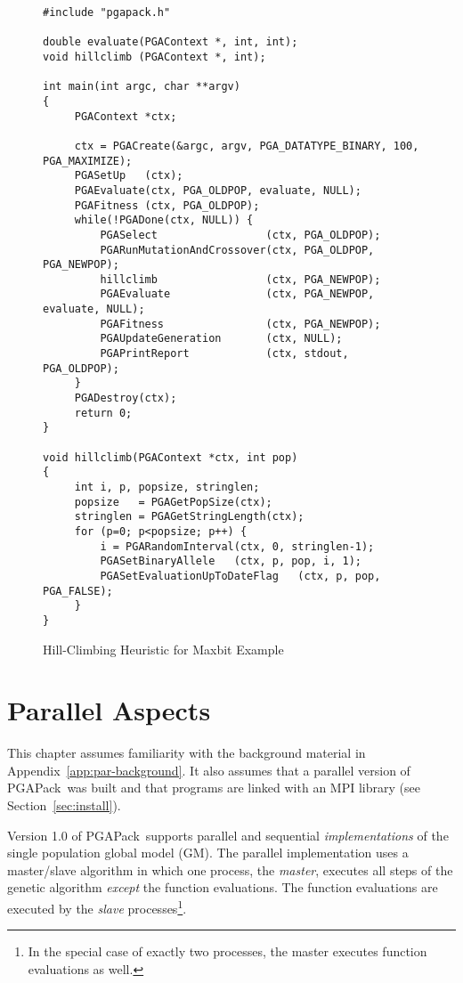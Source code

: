 \documentclass{report}
\newcommand{\pga}{PGAPack}
\begin{document}
\begin{figure}[th]
\begin{verbatim}
#include "pgapack.h"

double evaluate(PGAContext *, int, int);
void hillclimb (PGAContext *, int);

int main(int argc, char **argv)
{
     PGAContext *ctx;

     ctx = PGACreate(&argc, argv, PGA_DATATYPE_BINARY, 100, PGA_MAXIMIZE);
     PGASetUp   (ctx);
     PGAEvaluate(ctx, PGA_OLDPOP, evaluate, NULL);  
     PGAFitness (ctx, PGA_OLDPOP);
     while(!PGADone(ctx, NULL)) {
         PGASelect                 (ctx, PGA_OLDPOP);
         PGARunMutationAndCrossover(ctx, PGA_OLDPOP, PGA_NEWPOP);
         hillclimb                 (ctx, PGA_NEWPOP);
         PGAEvaluate               (ctx, PGA_NEWPOP, evaluate, NULL);
         PGAFitness                (ctx, PGA_NEWPOP);
         PGAUpdateGeneration       (ctx, NULL);
         PGAPrintReport            (ctx, stdout, PGA_OLDPOP);
     }
     PGADestroy(ctx);
     return 0;
}

void hillclimb(PGAContext *ctx, int pop)
{
     int i, p, popsize, stringlen;
     popsize   = PGAGetPopSize(ctx);
     stringlen = PGAGetStringLength(ctx);
     for (p=0; p<popsize; p++) {
         i = PGARandomInterval(ctx, 0, stringlen-1);
         PGASetBinaryAllele   (ctx, p, pop, i, 1);
         PGASetEvaluationUpToDateFlag   (ctx, p, pop, PGA_FALSE);
     }
}
\end{verbatim}
\caption{Hill-Climbing Heuristic for Maxbit Example}\label{example:hill}
\end{figure}

\chapter{Parallel Aspects}\label{chp:parallel}

This chapter assumes familiarity with the background material in
Appendix~\ref{app:par-background}.  It also assumes that a parallel version of
\pga\ was built and that programs are linked with
an MPI library (see Section~\ref{sec:install}).

Version 1.0 of \pga\ supports parallel and sequential {\em implementations} of
the single population global model (GM).  The parallel implementation uses a
master/slave algorithm in which one process, the {\em master}, executes all
steps of the genetic algorithm {\em except} the function evaluations.  The
function evaluations are executed by the {\em slave} processes\footnote{In the
special case of exactly two processes, the master executes function
evaluations as well.}.
\end{document}
